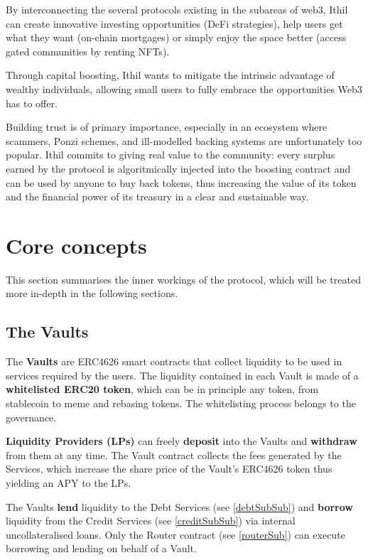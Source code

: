 \documentclass[a4paper,10 pt]{article}
\theoremstyle{definition}
\begin{document}
By interconnecting the several protocols existing in the subareas of web3, Ithil can create innovative investing opportunities (DeFi strategies), help users get what they want (on-chain mortgages) or simply enjoy the space better (access gated communities by renting NFTs).

Through capital boosting, Ithil wants to mitigate the intrinsic advantage of wealthy individuals, allowing small users to fully embrace the opportunities Web3 has to offer.

Building trust is of primary importance, especially in an ecosystem where scammers, Ponzi schemes, and ill-modelled backing systems are unfortunately too popular. Ithil commits to giving real value to the community: every surplus earned by the protocol is algoritmically injected into the boosting contract and can be used by anyone to buy back tokens, thus increasing the value of its token and the financial power of its treasury in a clear and sustainable way.

\newpage

\section{Core concepts}
This section summarises the inner workings of the protocol, which will be treated more in-depth in the following sections. 
\subsection{The Vaults}\label{vaultSub}
The {\bf Vaults} are ERC4626 smart contracts that collect liquidity to be used in services required by the users. The liquidity contained in each Vault is made of a {\bf whitelisted ERC20 token}, which can be in principle any token, from stablecoin to meme and rebasing tokens. The whitelisting process belongs to the governance.

{\bf Liquidity Providers (LPs)} can freely {\bf deposit} into the Vaults and {\bf withdraw} from them at any time. The Vault contract collects the fees generated by the Services, which increase the share price of the Vault's ERC4626 token thus yielding an APY to the LPs.

The Vaults {\bf lend} liquidity to the Debt Services (see \ref{debtSubSub}) and {\bf borrow} liquidity from the Credit Services (see \ref{creditSubSub}) via internal uncollateralised loans. Only the Router contract (see \ref{routerSub}) can execute borrowing and lending on behalf of a Vault.
\end{document}
